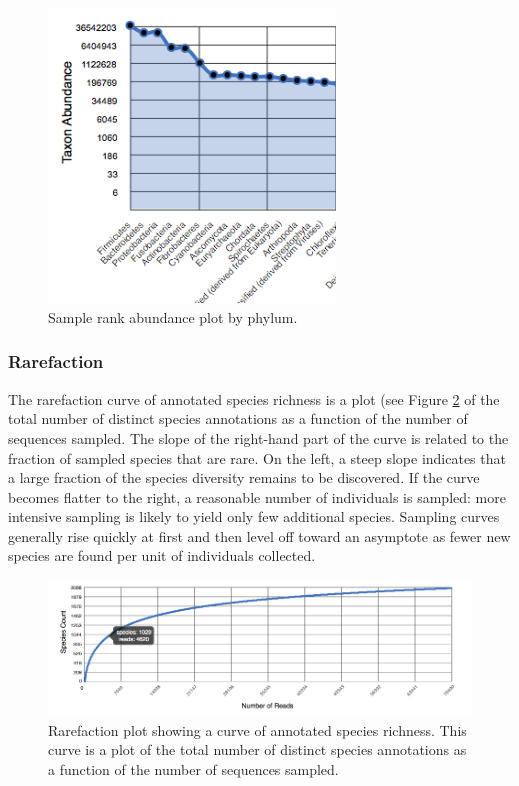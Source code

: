 \documentclass[12pt,fullpage]{report}
\begin{document}
\begin{figure}
\begin{center}
\includegraphics[width=3in]{Images/rank-abundance.png}
\end{center}
\caption{
Sample rank abundance plot by phylum.
}
\label{fig:rank-abundance}
\end{figure}
\subsubsection{Rarefaction}
The rarefaction curve of annotated species richness is a plot (see Figure \ref{fig:rarefaction} of the total number of distinct species annotations as a function of the number of sequences sampled.
The slope of the right-hand part of the curve is related to the fraction of sampled species that are rare.
On the left, a steep slope indicates that a large fraction of the species diversity remains to be discovered. If the curve becomes flatter to the right, a reasonable number of individuals is sampled: more intensive sampling is likely to yield only few additional species.
Sampling curves generally rise quickly at first and then level off toward an asymptote as fewer new species are found per unit of individuals collected.


\begin{figure}
\begin{center}
\includegraphics[width=6in]{Images/rarefaction.png}
\end{center}
\caption{
Rarefaction plot showing a curve of annotated species richness. This curve is a plot of the total number of distinct species annotations as a function of the number of sequences sampled.
}
\label{fig:rarefaction}
\end{figure}
\end{document}
